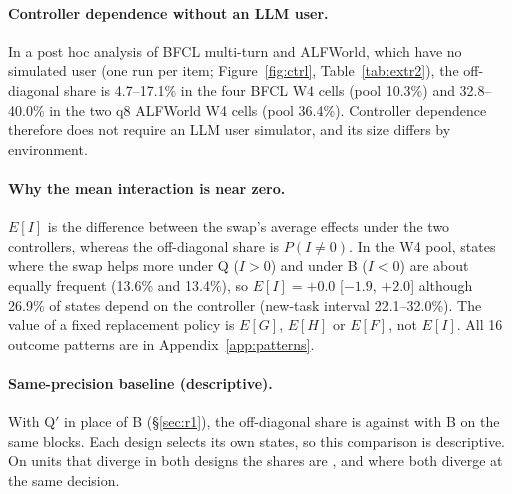 \paragraph{Controller dependence without an LLM user.} In a post hoc analysis of BFCL multi-turn and ALFWorld, which have no simulated user (one run per item; Figure~\ref{fig:ctrl}, Table~\ref{tab:extr2}), the off-diagonal share is 4.7--17.1\% in the four BFCL W4 cells (pool 10.3\%) and 32.8--40.0\% in the two q8 ALFWorld W4 cells (pool 36.4\%). Controller dependence therefore does not require an LLM user simulator, and its size differs by environment. %

\paragraph{Why the mean interaction is near zero.} $E[I]$ is the difference between the swap's average effects under the two controllers, whereas the off-diagonal share is $P(I\neq0)$. In the W4 pool, states where the swap helps more under Q ($I>0$) and under B ($I<0$) are about equally frequent (13.6\% and 13.4\%), so $E[I]=+0.0$ [$-1.9$, $+2.0$]\pp{} although 26.9\% of states depend on the controller (new-task interval 22.1--32.0\%). %
The value of a fixed replacement policy is $E[G]$, $E[H]$ or $E[F]$, not $E[I]$. All 16 outcome patterns are in Appendix~\ref{app:patterns}.

\paragraph{Same-precision baseline (descriptive).} With Q$'$ in place of B (\S\ref{sec:r1}), the off-diagonal share is  against  with B on the same blocks. Each design selects its own states, so this comparison is descriptive. On units that diverge in both designs the shares are , and  where both diverge at the same decision. %
